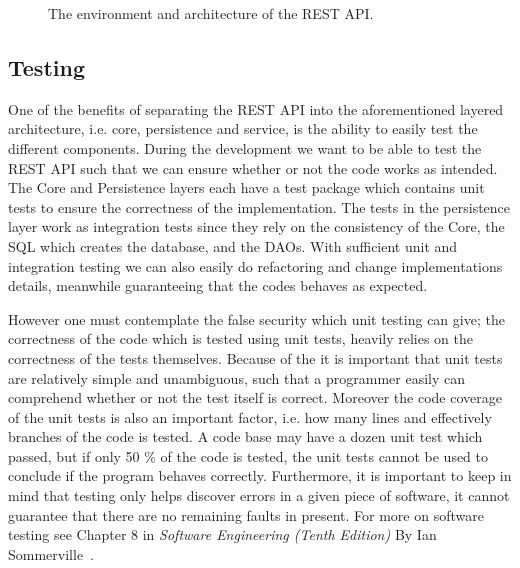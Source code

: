 \begin{figure}[h]
    \centering
    
    \caption{The environment and architecture of the REST API.}
    \label{fig:rest-architecture}
\end{figure}

\subsection{Testing}
One of the benefits of separating the REST API into the aforementioned layered architecture, i.e. core, persistence and service, is the ability to easily test the different components.
During the development we want to be able to test the REST API such that we can ensure whether or not the code works as intended.
The Core and Persistence layers each have a test package which contains unit tests to ensure the correctness of the implementation.
The tests in the persistence layer work as integration tests since they rely on the consistency of the Core, the SQL which creates the database, and the DAOs.
With sufficient unit and integration testing we can also easily do refactoring and change implementations details, meanwhile guaranteeing that the codes behaves as expected.

However one must contemplate the false security which unit testing can give; the correctness of the code which is tested using unit tests, heavily relies on the correctness of the tests themselves.
Because of the it is important that unit tests are relatively simple and unambiguous, such that a programmer easily can comprehend whether or not the test itself is correct.
Moreover the code coverage of the unit tests is also an important factor, i.e. how many lines and effectively branches of the code is tested.
A code base may have a dozen unit test which passed, but if only 50 \% of the code is tested, the unit tests cannot be used to conclude if the program behaves correctly.
Furthermore, it is important to keep in mind that testing only helps discover errors in a given piece of software, it cannot guarantee that there are no remaining faults in present. For more on software testing see Chapter 8 in \textit{Software Engineering (Tenth Edition)} By Ian Sommerville~\cite[Chapter~8]{SEBOOK}.
